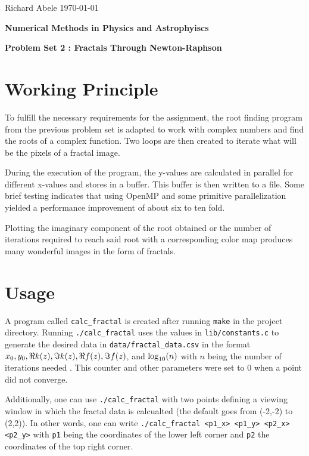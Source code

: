 \documentclass[12pt]{article}
\DeclarePairedDelimiter\rb{(}{)}
\begin{document}
\noindent Richard Abele \hfill \today \\[30pt]
\centerline{ \Large{ \textbf{ Numerical Methods in Physics and Astrophyiscs }}}
\centerline{ \Large{ \textbf{ Problem Set 2 : Fractals Through Newton-Raphson }}}

\section{Working Principle}
\label{sec:principle}



To fulfill the necessary requirements for the assignment, the root finding program from the previous problem set is adapted to work with complex numbers and find the roots of a complex function. Two loops are then created to iterate what will be the pixels of a fractal image. 

During the execution of the program, the y-values are calculated in parallel for different x-values and stores in a buffer. This buffer is then written to a file. Some brief testing indicates that using OpenMP and some primitive parallelization yielded a performance improvement of about six to ten fold. 

Plotting the imaginary component of the root obtained or the number of iterations required to reach said root with a corresponding color map produces many wonderful images in the form of fractals. 

\section{Usage}
\label{sec:usage}


A program called \texttt{calc_fractal} is created after running \texttt{make} in the project directory. Running \texttt{./calc_fractal} uses the values in \texttt{lib/constants.c} to generate the desired data in \texttt{data/fractal_data.csv} in the format \(x_{0},y_{0},  \Re k\rb*{z}, \Im k \rb*{z}, \Re f \rb*{z}, \Im f \rb*{z}\), and \(\log_{10}\rb*{n}\) with \(n\) being the number of iterations needed . This counter and other parameters were set to 0 when a point did not converge. 

Additionally, one can use \texttt{./calc_fractal} with two points defining a viewing window in which the fractal data is calcualted (the default goes from (-2,-2) to (2,2)). In other words, one can write \texttt{./calc_fractal <p1_x> <p1_y> <p2_x> <p2_y>} with \texttt{p1} being the coordinates of the lower left corner and \texttt{p2} the coordinates of the top right corner. 
\end{document}
